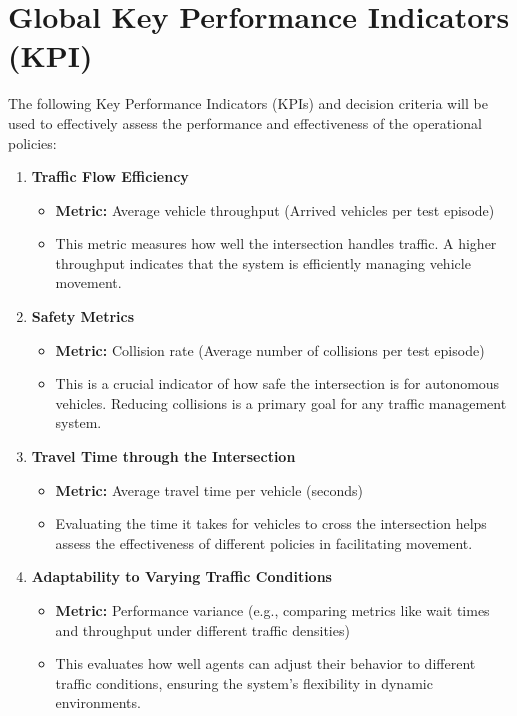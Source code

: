 \section{Global Key Performance Indicators (KPI)}

The following Key Performance Indicators (KPIs) and decision criteria will be used to effectively assess the performance and effectiveness of the operational policies:

\begin{enumerate}
    \item \textbf{Traffic Flow Efficiency}
    \begin{itemize}
        \item \textbf{Metric:} Average vehicle throughput (Arrived vehicles per test episode)
        \item This metric measures how well the intersection handles traffic. A higher throughput indicates that the system is efficiently managing vehicle movement.
    \end{itemize}
    
    \item \textbf{Safety Metrics}
    \begin{itemize}
        \item \textbf{Metric:} Collision rate (Average number of collisions per test episode)
        \item This is a crucial indicator of how safe the intersection is for autonomous vehicles. Reducing collisions is a primary goal for any traffic management system.
    \end{itemize}
    
    \item \textbf{Travel Time through the Intersection}
    \begin{itemize}
        \item \textbf{Metric:} Average travel time per vehicle (seconds)
        \item Evaluating the time it takes for vehicles to cross the intersection helps assess the effectiveness of different policies in facilitating movement.
    \end{itemize}
    
    \item \textbf{Adaptability to Varying Traffic Conditions}
    \begin{itemize}
        \item \textbf{Metric:} Performance variance (e.g., comparing metrics like wait times and throughput under different traffic densities)
        \item This evaluates how well agents can adjust their behavior to different traffic conditions, ensuring the system's flexibility in dynamic environments.
    \end{itemize}
\end{enumerate}

